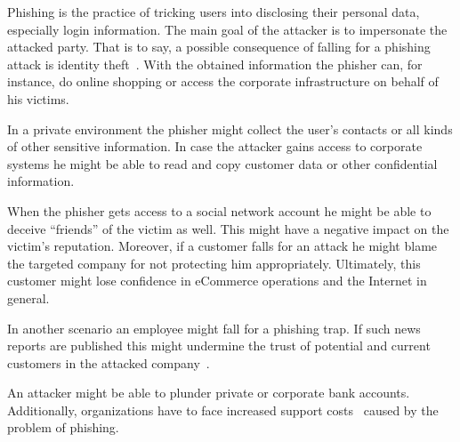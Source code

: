 \begin{description}[leftmargin=0cm]
	\item[Identity Theft:] Phishing is the practice of tricking users into disclosing their personal data, especially login information. The main goal of the attacker is to impersonate the attacked party. That is to say, a possible consequence of falling for a phishing attack is identity theft~\cite{jakobsson2006phishing}. With the obtained information the phisher can, for instance, do online shopping or access the corporate infrastructure on behalf of his victims.
	\item[Data theft:]
	 In a private environment the phisher might collect the user's contacts or all kinds of other sensitive information.
In case the attacker gains access to corporate systems he might be able to read and copy customer data or other confidential information.
 	\item[Reputational Damage:]
 	When the phisher gets access to a social network account he might be able to deceive ``friends'' of the victim as well. This might have a negative impact on the victim's reputation.
 	 Moreover, if a customer falls for an attack he might blame the targeted company for not protecting him appropriately. 
 	 Ultimately, this customer might lose confidence in eCommerce operations and the Internet in general.

In another scenario an employee might fall for a phishing trap.
If such news reports are published this might undermine the trust of potential and current customers in the attacked company~\cite{mcafee, redcondor}. 
	\item[Financial Loss:]
	An attacker might be able to plunder private or corporate bank accounts. Additionally, organizations have to face increased support costs~\cite{rsa2013, mcafee} caused by the problem of phishing.
\end{description}
 
